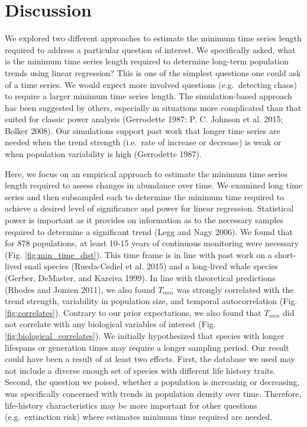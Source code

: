 \documentclass[12pt,]{article}
\begin{document}
\section{Discussion}\label{discussion}

We explored two different approaches to estimate the minimum time series
length required to address a particular question of interest. We
specifically asked, what is the minimum time series length required to
determine long-term population trends using linear regression? This is
one of the simplest questions one could ask of a time series. We would
expect more involved questions (e.g.~detecting chaos) to require a
larger minimum time series length. The simulation-based approach has
been suggested by others, especially in situations more complicated than
that suited for classic power analysis (Gerrodette 1987; P. C. Johnson
et al. 2015; Bolker 2008). Our simulations support past work that longer
time series are needed when the trend strength (i.e.~rate of increase or
decrease) is weak or when population variability is high (Gerrodette
1987).

Here, we focus on an empirical approach to estimate the minimum time
series length required to assess changes in abundance over time. We
examined long time series and then subsampled each to determine the
minimum time required to achieve a desired level of significance and
power for linear regression. Statistical power is important as it
provides on information as to the necessary samples required to
determine a significant trend (Legg and Nagy 2006). We found that for
878 populations, at least 10-15 years of continuous monitoring were
necessary (Fig. \ref{fig:min_time_dist}). This time frame is in line
with past work on a short-lived snail species (Rueda-Cediel et al. 2015)
and a long-lived whale species (Gerber, DeMaster, and Kareiva 1999). In
line with theoretical predictions (Rhodes and Jonzen 2011), we also
found \(T_{min}\) was strongly correlated with the trend strength,
variability in population size, and temporal autocorrelation (Fig.
\ref{fig:correlates}). Contrary to our prior expectations, we also found
that \(T_{min}\) did not correlate with any biological variables of
interest (Fig. \ref{fig:biological_correlates}). We initially
hypothesized that species with longer lifespans or generation times may
require a longer sampling period. Our result could have been a result of
at least two effects. First, the database we used may not include a
diverse enough set of species with different life history traits.
Second, the question we poised, whether a population is increasing or
decreasing, was specifically concerned with trends in population density
over time. Therefore, life-history characteristics may be more important
for other questions (e.g.~extinction risk) where estimates minimum time
required are needed.
\end{document}
